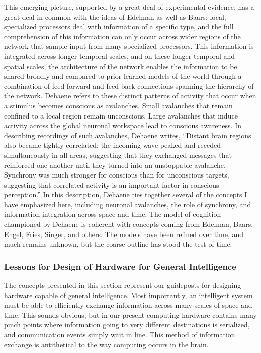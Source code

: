 This emerging picture, supported by a great deal of experimental evidence, has a great deal in common with the ideas of Edelman as well as Baars: local, specialized processors deal with information of a specific type, and the full comprehension of this information can only occur across wider regions of the network that sample input from many specialized processors. This information is integrated across longer temporal scales, and on these longer temporal and spatial scales, the architecture of the network enables the information to be shared broadly and compared to prior learned models of the world through a combination of feed-forward and feed-back connections spanning the hierarchy of the network. Dehaene refers to these distinct patterns of activity that occur when a stimulus becomes conscious as avalanches. Small avalanches that remain confined to a local region remain unconscious. Large avalanches that induce activity across the global neuronal workspace lead to conscious awareness. In describing recordings of such avalanches, Dehaene writes, ``Distant brain regions also became tightly correlated: the incoming wave peaked and receded simultaneously in all areas, suggesting that they exchanged messages that reinforced one another until they turned into an unstoppable avalanche. Synchrony was much stronger for conscious than for unconscious targets, suggesting that correlated activity is an important factor in conscious perception.'' \cite{de2015} In this description, Dehaene ties together several of the concepts I have emphasized here, including neuronal avalanches, the role of synchrony, and information integration across space and time. The model of cognition championed by Dehaene is coherent with concepts coming from Edelman, Baars, Engel, Fries, Singer, and others. The models have been refined over time, and much remains unknown, but the coarse outline has stood the test of time. 


\subsubsection{Lessons for Design of Hardware for General Intelligence}
The concepts presented in this section represent our guideposts for designing hardware capable of general intelligence. Most importantly, an intelligent system must be able to efficiently exchange information across many scales of space and time. This sounds obvious, but in our present computing hardware contains many pinch points where information going to very different destinations is serialized, and communication events simply wait in line. This method of information exchange is antithetical to the way computing occurs in the brain.

